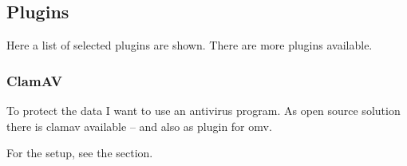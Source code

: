 

\subsection{Plugins}

Here a list of selected plugins are shown. There are more plugins available.

\subsubsection{ClamAV}\label{sec:clamav}

To protect the data I want to use an antivirus program. As open source solution
there is \gls{clamav} available -- and also as plugin for \gls{omv}.


For the setup, see the  section.


